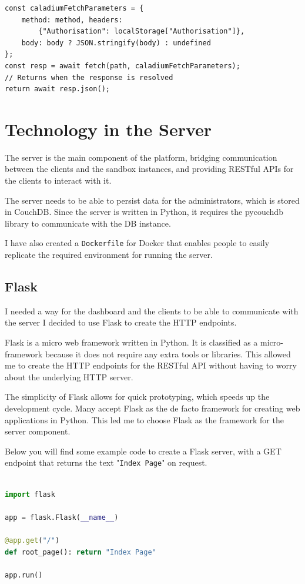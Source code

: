 \begin{lstlisting}
const caladiumFetchParameters = {
    method: method, headers:
        {"Authorisation": localStorage["Authorisation"]},
    body: body ? JSON.stringify(body) : undefined
};
const resp = await fetch(path, caladiumFetchParameters);
// Returns when the response is resolved
return await resp.json();
\end{lstlisting}

\section{Technology in the Server}
The server is the main component of the platform,
bridging communication between the clients and the sandbox instances, 
and providing RESTful APIs for the clients to interact with it.

The server needs to be able to persist data for the administrators, 
which is stored in CouchDB. Since the server is written in Python,
it requires the pycouchdb library to communicate with the DB instance.

I have also created a \texttt{Dockerfile} for Docker
that enables people to easily replicate the required
environment for running the server.

\subsection{Flask}
I needed a way for the dashboard and the clients to be
able to communicate with the server
I decided to use Flask to create the HTTP endpoints.

Flask \cite{flask} is a micro web framework written in Python.
It is classified as a micro-framework because it does
not require any extra tools or libraries.
This allowed me to create the HTTP endpoints for the RESTful API without
having to worry about the underlying HTTP server.

The simplicity of Flask allows for quick prototyping,
which speeds up the development cycle.
Many accept Flask as the de facto framework
for creating web applications in Python.
This led me to choose Flask as the framework for the server component.

Below you will find some example code to create a Flask server,
with a GET endpoint that returns the text "\texttt{Index Page}" on request. \\ \\

\begin{lstlisting}[language=Python]
import flask

app = flask.Flask(__name__)

@app.get("/")
def root_page(): return "Index Page"

app.run()
\end{lstlisting}

